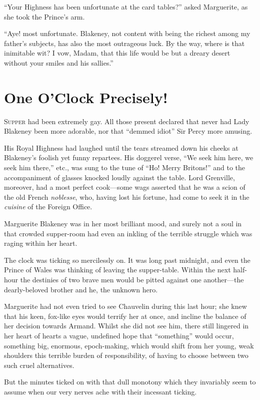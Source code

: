 \documentclass[paper=a5,BCOR=7mm,twoside,DIV=calc,12pt,usegeometry,chapterprefix,endperiod,headings=big]{scrbook}
\begin{document}
\enquote{Your Highness has been unfortunate at the card tables?} asked Marguerite, as she took the Prince's arm.

\enquote{Aye! most unfortunate. Blakeney, not content with being the richest among my father's subjects, has also the most outrageous luck. By the way, where is that inimitable wit? I vow, Madam, that this life would be but a dreary desert without your smiles and his sallies.}

\chapter{One O'Clock Precisely!}
\lettrine[lines=4]{S}{upper} had been extremely gay. All those present declared that never had Lady Blakeney been more adorable, nor that \enquote{demmed idiot} Sir Percy more amusing.

His Royal Highness had laughed until the tears streamed down his cheeks at Blakeney's foolish yet funny repartees. His doggerel verse, \enquote{We seek him here, we seek him there,} etc., was sung to the tune of \enquote{Ho! Merry Britons!} and to the accompaniment of glasses knocked loudly against the table. Lord Grenville, moreover, had a most perfect cook---some wags asserted that he was a scion of the old French \textit{noblesse}, who, having lost his fortune, had come to seek it in the \textit{cuisine} of the Foreign Office.

Marguerite Blakeney was in her most brilliant mood, and surely not a soul in that crowded supper-room had even an inkling of the terrible struggle which was raging within her heart.

The clock was ticking so mercilessly on. It was long past midnight, and even the Prince of Wales was thinking of leaving the supper-table. Within the next half-hour the destinies of two brave men would be pitted against one another---the dearly-beloved brother and he, the unknown hero.

Marguerite had not even tried to see Chauvelin during this last hour; she knew that his keen, fox-like eyes would terrify her at once, and incline the balance of her decision towards Armand. Whilst she did not see him, there still lingered in her heart of hearts a vague, undefined hope that \enquote{something} would occur, something big, enormous, epoch-making, which would shift from her young, weak shoulders this terrible burden of responsibility, of having to choose between two such cruel alternatives.

But the minutes ticked on with that dull monotony which they invariably seem to assume when our very nerves ache with their incessant ticking.
\end{document}

